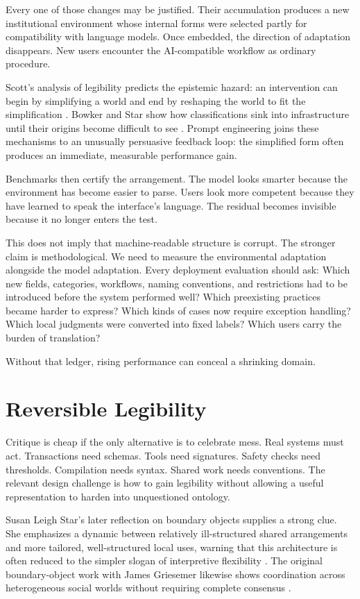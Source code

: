 \documentclass[11pt]{article}
\begin{document}
Every one of those changes may be justified. Their accumulation produces a new institutional environment whose internal forms were selected partly for compatibility with language models. Once embedded, the direction of adaptation disappears. New users encounter the AI-compatible workflow as ordinary procedure.

Scott's analysis of legibility predicts the epistemic hazard: an intervention can begin by simplifying a world and end by reshaping the world to fit the simplification \citep{scott1998seeing}. Bowker and Star show how classifications sink into infrastructure until their origins become difficult to see \citep{bowkerstar1999sorting}. Prompt engineering joins these mechanisms to an unusually persuasive feedback loop: the simplified form often produces an immediate, measurable performance gain.

Benchmarks then certify the arrangement. The model looks smarter because the environment has become easier to parse. Users look more competent because they have learned to speak the interface's language. The residual becomes invisible because it no longer enters the test.

This does not imply that machine-readable structure is corrupt. The stronger claim is methodological. We need to measure the environmental adaptation alongside the model adaptation. Every deployment evaluation should ask: Which new fields, categories, workflows, naming conventions, and restrictions had to be introduced before the system performed well? Which preexisting practices became harder to express? Which kinds of cases now require exception handling? Which local judgments were converted into fixed labels? Which users carry the burden of translation?

Without that ledger, rising performance can conceal a shrinking domain.

\section{Reversible Legibility}

Critique is cheap if the only alternative is to celebrate mess. Real systems must act. Transactions need schemas. Tools need signatures. Safety checks need thresholds. Compilation needs syntax. Shared work needs conventions. The relevant design challenge is how to gain legibility without allowing a useful representation to harden into unquestioned ontology.

Susan Leigh Star's later reflection on boundary objects supplies a strong clue. She emphasizes a dynamic between relatively ill-structured shared arrangements and more tailored, well-structured local uses, warning that this architecture is often reduced to the simpler slogan of interpretive flexibility \citep{star2010boundary}. The original boundary-object work with James Griesemer likewise shows coordination across heterogeneous social worlds without requiring complete consensus \citep{stargriesemer1989boundary}.
\end{document}
